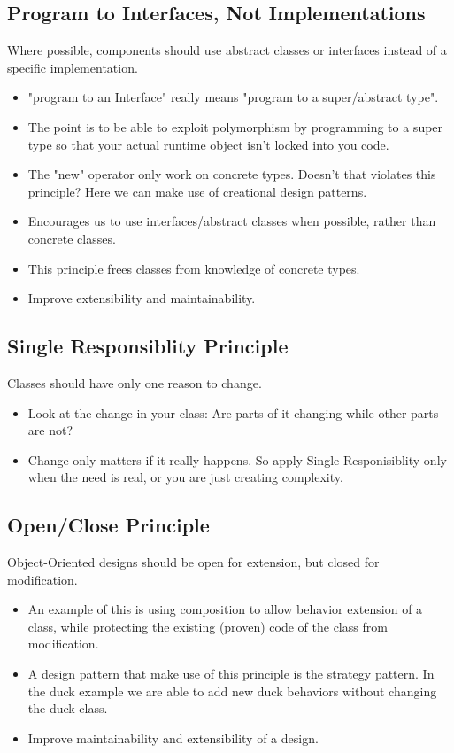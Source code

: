 \documentclass[11pt]{article}
\begin{document}
    \subsection{Program to Interfaces, Not Implementations}
    Where possible, components should use abstract classes or interfaces instead of a specific implementation.
    \begin{itemize}
        \item "program to an Interface" really means "program to a super/abstract type".
        \item The point is to be able to exploit polymorphism by programming to a super type so that your
        actual runtime object isn't locked into you code.
        \item The "new" operator only work on concrete types. Doesn't that violates this principle? Here we can
        make use of creational design patterns.
        \item Encourages us to use interfaces/abstract classes when possible, rather than concrete classes.
        \item This principle frees classes from knowledge of concrete types.
        \item Improve extensibility and maintainability.
    \end{itemize}

    \subsection{Single Responsiblity Principle}
    Classes should have only one reason to change.
    \begin{itemize}
        \item Look at the change in your class: Are parts of it changing while other parts are not?
        \item Change only matters if it really happens. So apply Single Responisiblity only when the need is real, or you
        are just creating complexity.
    \end{itemize}

    \subsection{Open/Close Principle}
    Object-Oriented designs should be open for extension, but closed for modification.
    \begin{itemize}
        \item An example of this is using composition to allow behavior extension of a class, while protecting the existing
        (proven) code of the class from modification.
        \item A design pattern that make use of this principle is the strategy pattern. In the duck example we are able
        to add new duck behaviors without changing the duck class.
        \item Improve maintainability and extensibility of a design.
    \end{itemize}
\end{document}
